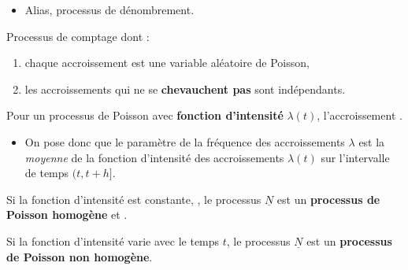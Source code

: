 \documentclass[french]{article}
\begin{document}
\begin{multicols*}{2}
\begin{definitionNOHFILLsub}
\tcbline

\begin{itemize}
	\item	Alias, processus de dénombrement.
\end{itemize}
\end{definitionNOHFILLsub}

\begin{definitionNOHFILLsub}
Processus de comptage dont :
\begin{enumerate}
	\item	chaque accroissement est une variable aléatoire de Poisson,
	\item	les accroissements qui ne se \textbf{chevauchent pas} sont indépendants.
\end{enumerate}

\bigskip

Pour un processus de Poisson avec \textbf{fonction d'intensité} $\lambda(t)$, l'accroissement . 
\begin{itemize}
	\item	On pose donc que le paramètre de la fréquence des accroissements $\lambda$ est la \textit{moyenne} de la fonction d'intensité des accroissements $\lambda(t)$ sur l'intervalle de temps $(t, t + h]$.
\end{itemize}

\begin{definitionNOHFILLprop}
Si la fonction d'intensité est constante, , le processus $\underline{N}$ est un \textbf{processus de Poisson homogène} et .
\end{definitionNOHFILLprop}

\begin{definitionNOHFILLprop}
Si la fonction d'intensité varie avec le temps $t$, le processus $\underline{N}$ est un \textbf{processus de Poisson non homogène}.
\end{definitionNOHFILLprop}
\end{definitionNOHFILLsub}


\columnbreak

\end{multicols*}
\end{document}
